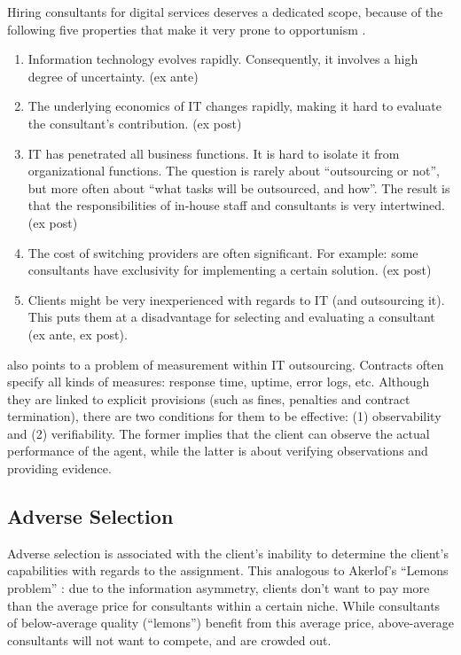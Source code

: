\documentclass[12pt]{article}
\providecommand{\tightlist}{%
  \setlength{\itemsep}{0pt}\setlength{\parskip}{0pt}}
\begin{document}
Hiring consultants for digital services deserves a dedicated scope,
because of the following five properties that make it very prone to
opportunism \citep[ 207]{leslie1995}.

\begin{enumerate}
\def\labelenumi{\arabic{enumi}.}
\tightlist
\item
  Information technology evolves rapidly. Consequently, it involves a
  high degree of uncertainty. (ex ante)
\item
  The underlying economics of IT changes rapidly, making it hard to
  evaluate the consultant's contribution. (ex post)
\item
  IT has penetrated all business functions. It is hard to isolate it
  from organizational functions. The question is rarely about
  ``outsourcing or not'', but more often about ``what tasks will be
  outsourced, and how''. The result is that the responsibilities of
  in-house staff and consultants is very intertwined. (ex post)
\item
  The cost of switching providers are often significant. For example:
  some consultants have exclusivity for implementing a certain solution.
  (ex post)
\item
  Clients might be very inexperienced with regards to IT (and
  outsourcing it). This puts them at a disadvantage for selecting and
  evaluating a consultant (ex ante, ex post).
\end{enumerate}

\citet[59]{aubert1996} also points to a problem of measurement within IT
outsourcing. Contracts often specify all kinds of measures: response
time, uptime, error logs, etc. Although they are linked to explicit
provisions (such as fines, penalties and contract termination), there
are two conditions for them to be effective: (1) observability and (2)
verifiability. The former implies that the client can observe the actual
performance of the agent, while the latter is about verifying
observations and providing evidence.

\hypertarget{adverse-selection}{%
\subsection{Adverse Selection}\label{adverse-selection}}

Adverse selection is associated with the client's inability to determine
the client's capabilities with regards to the assignment. This analogous
to Akerlof's ``Lemons problem'' \citeyearpar{akerlof1970}: due to the
information asymmetry, clients don't want to pay more than the average
price for consultants within a certain niche. While consultants of
below-average quality (``lemons'') benefit from this average price,
above-average consultants will not want to compete, and are crowded out.
\end{document}
